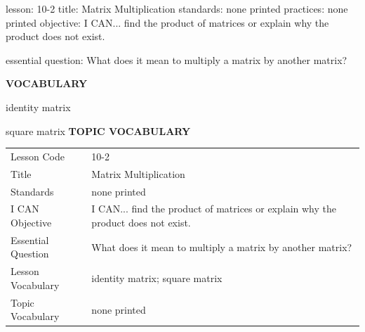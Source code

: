 \documentclass{article}
\newenvironment{lesson-meta}{}{}        %
\newcommand{\te}[1]{}                   %
\begin{document}
\begin{lesson-meta}
lesson: 10-2
title: Matrix Multiplication
standards: none printed
practices: none printed
objective: I CAN... find the product of matrices or explain why the product does not exist.

essential question: What does it mean to multiply a matrix by another matrix?

\textbf{VOCABULARY}
\item identity matrix
\item square matrix
\textbf{TOPIC VOCABULARY}
\te{No separate topic vocabulary list is printed on these lesson pages.}
\begin{tabular}{ll}
Lesson Code & 10-2 \\
Title & Matrix Multiplication \\
Standards & none printed \\
I CAN Objective & I CAN... find the product of matrices or explain why the product does not exist. \\
Essential Question & What does it mean to multiply a matrix by another matrix? \\
Lesson Vocabulary & identity matrix; square matrix \\
Topic Vocabulary & none printed \\
\end{tabular}
\end{lesson-meta}
\end{document}
